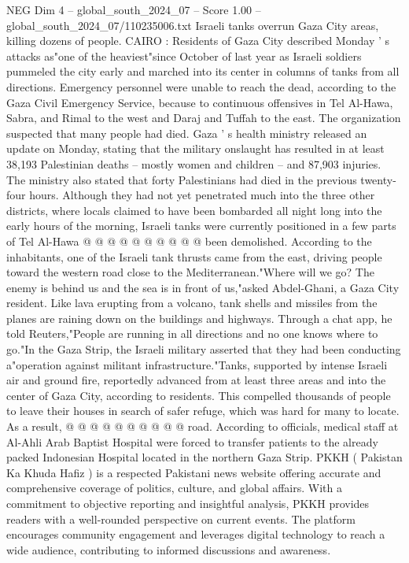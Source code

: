 \begin{textsample}{NEG Dim 4 – global\_south\_2024\_07 – Score 1.00 – global\_south\_2024\_07/110235006.txt}  \label{ex:f4_neg_349}
Israeli tanks overrun Gaza City areas, killing dozens of people.
CAIRO : Residents of Gaza City described Monday ' s attacks as"one of the heaviest"since October of last year as Israeli soldiers pummeled the city early and marched into its center in columns of tanks from all directions.
Emergency personnel were unable to reach the dead, according to the Gaza Civil Emergency Service, because to continuous offensives in Tel Al-Hawa, Sabra, and Rimal to the west and Daraj and Tuffah to the east.
The organization suspected that many people had died.
Gaza ' s health ministry released an update on Monday, stating that the military onslaught has resulted in at least 38,193 Palestinian deaths -- mostly women and children -- and 87,903 injuries.
The ministry also stated that forty Palestinians had died in the previous twenty-four hours.
Although they had not yet penetrated much into the three other districts, where locals claimed to have been bombarded all night long into the early hours of the morning, Israeli tanks were currently positioned in a few parts of Tel Al-Hawa @ @ @ @ @ @ @ @ @ @ been demolished.
According to the inhabitants, one of the Israeli tank thrusts came from the east, driving people toward the western road close to the Mediterranean."Where will we go?
The enemy is behind us and the sea is in front of us,"asked Abdel-Ghani, a Gaza City resident.
Like lava erupting from a volcano, tank shells and missiles from the planes are raining down on the buildings and highways.
Through a chat app, he told Reuters,"People are running in all directions and no one knows where to go."In the Gaza Strip, the Israeli military asserted that they had been conducting a"operation against militant infrastructure."Tanks, supported by intense Israeli air and ground fire, reportedly advanced from at least three areas and into the center of Gaza City, according to residents.
This compelled thousands of people to leave their houses in search of safer refuge, which was hard for many to locate.
As a result, @ @ @ @ @ @ @ @ @ @ road.
According to officials, medical staff at Al-Ahli Arab Baptist Hospital were forced to transfer patients to the already packed Indonesian Hospital located in the northern Gaza Strip.
PKKH ( Pakistan Ka Khuda Hafiz ) is a respected Pakistani news website offering accurate and comprehensive coverage of politics, culture, and global affairs.
With a commitment to objective reporting and insightful analysis, PKKH provides readers with a well-rounded perspective on current events.
The platform encourages community engagement and leverages digital technology to reach a wide audience, contributing to informed discussions and awareness.

\end{textsample}
